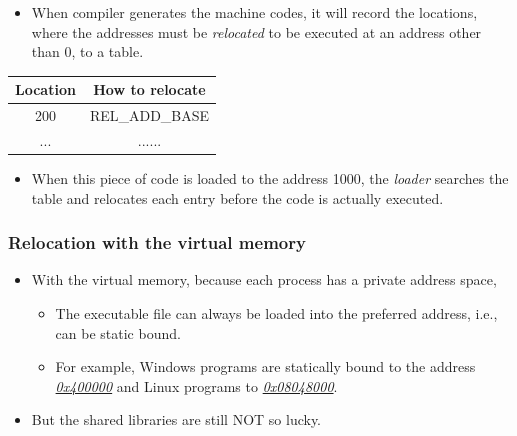 \documentclass[CJKutf8,dvipsnames,table]{beamer}
\begin{document}
\begin{CJK*}{UTF8}{song}
\begin{frame}[fragile]
\begin{itemize}
    \item{When compiler generates the machine codes, it will record the locations, where the addresses must be \emph{relocated} to be executed at an address other than 0, to a table.} \pause
    \end{itemize}
    \begin{minipage}[c]{0.5\textwidth}
      \begin{table}
        \centering
        \small
        \begin{tabular}{|c|c|}
          \hline
          Location & How to relocate\\
          \hline\hline
          200 & REL\_ADD\_BASE\\
          ... & ......\\
          \hline
        \end{tabular} \pause
        \normalsize
      \end{table}
    \end{minipage}%
    \begin{minipage}[c]{0.5\textwidth}
      \begin{itemize}
      \item{When this piece of code is loaded to the address 1000, the \emph{loader} searches the table and relocates each entry before the code is actually executed.}
      \end{itemize}
    \end{minipage}
  \end{frame}

  \fi
  
  \begin{frame}
    \frametitle{Relocation with the virtual memory} \pause
    \begin{itemize}
    \item{With the virtual memory, because each process has a private address space,} \pause
      \begin{itemize}
      \item{The executable file can always be loaded into the preferred address, i.e., can be static bound.} \pause
      \item{For example, Windows programs are statically bound to the address \href{https://blogs.msdn.microsoft.com/oldnewthing/20141003-00/?p=43923}{\emph{0x400000}} and Linux programs to \href{https://stackoverflow.com/questions/2966426/why-do-virtual-memory-addresses-for-linux-binaries-start-at-0x8048000}{\emph{0x08048000}}.} \pause
      \end{itemize}
    \item{But the shared libraries are still NOT so lucky.}
    \end{itemize}
  \end{frame}


\end{CJK*}
\end{document}
